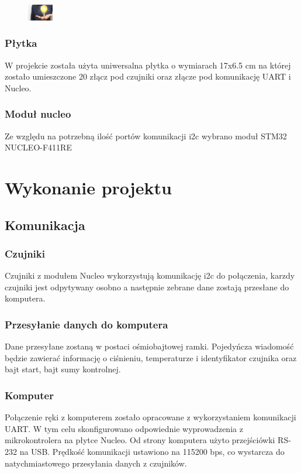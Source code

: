 \documentclass[a4paper,12pt]{article}
\begin{document}
			\begin{figure}[H]
		     	 \includegraphics[width=0.1\textwidth]{obrazy/plytka.png}
			\end{figure}
		
			\subsubsection{Płytka}
				W projekcie została użyta uniwersalna płytka o wymiarach 17x6.5 cm na której zostało umieszczone 20 złącz pod czujniki oraz złącze pod komunikację UART i Nucleo. 
						
			\subsubsection{Moduł nucleo}
				Ze względu na potrzebną ilość portów komunikacji i2c wybrano moduł STM32 NUCLEO-F411RE
			
	\section{Wykonanie projektu}		
		\subsection{Komunikacja}
			\subsubsection{Czujniki}		
				Czujniki z modułem Nucleo wykorzystują komunikację i2c do połączenia, karzdy czujniki jest odpytywany osobno a następnie zebrane dane zostają przesłane do komputera.
			\subsubsection{Przesyłanie danych do komputera}
			Dane przesyłane zostaną w postaci ośmiobajtowej ramki. Pojedyńcza wiadomość będzie zawierać informację o ciśnieniu, temperaturze i identyfikator czujnika oraz bajt start, bajt sumy kontrolnej.
			\subsubsection{Komputer}
				Połączenie ręki z komputerem zostało opracowane z wykorzystaniem komunikacji UART. W tym celu skonfigurowano odpowiednie wyprowadzenia z mikrokontrolera na płytce Nucleo. Od strony komputera użyto przejściówki RS-232 na USB. Prędkość komunikacji ustawiono na 115200 bps, co wystarcza do natychmiastowego przesyłania danych z czujników.	
\end{document}
